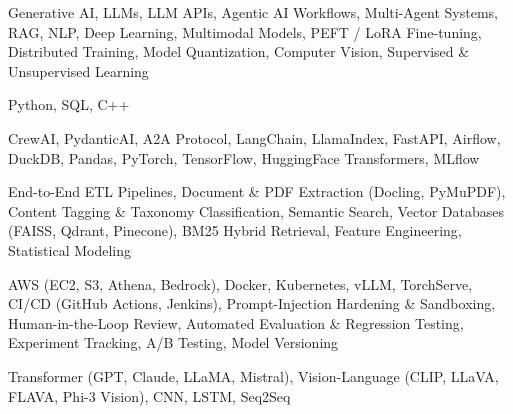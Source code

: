 \documentclass[letter,10pt]{article}
\begin{document}
 Generative AI, LLMs, LLM APIs, Agentic AI Workflows, Multi-Agent Systems, RAG, NLP, Deep Learning, Multimodal Models, PEFT / LoRA Fine-tuning, Distributed Training, Model Quantization, Computer Vision, Supervised \& Unsupervised Learning\par\vspace{2pt}

 Python, SQL, C++\par\vspace{2pt}

 CrewAI, PydanticAI, A2A Protocol, LangChain, LlamaIndex, FastAPI, Airflow, DuckDB, Pandas, PyTorch, TensorFlow, HuggingFace Transformers, MLflow\par\vspace{2pt}

 End-to-End ETL Pipelines, Document \& PDF Extraction (Docling, PyMuPDF), Content Tagging \& Taxonomy Classification, Semantic Search, Vector Databases (FAISS, Qdrant, Pinecone), BM25 Hybrid Retrieval, Feature Engineering, Statistical Modeling\par\vspace{2pt}

 AWS (EC2, S3, Athena, Bedrock), Docker, Kubernetes, vLLM, TorchServe, CI/CD (GitHub Actions, Jenkins), Prompt-Injection Hardening \& Sandboxing, Human-in-the-Loop Review, Automated Evaluation \& Regression Testing, Experiment Tracking, A/B Testing, Model Versioning\par\vspace{2pt}

 Transformer (GPT, Claude, LLaMA, Mistral), Vision-Language (CLIP, LLaVA, FLAVA, Phi-3 Vision), CNN, LSTM, Seq2Seq
\end{document}
